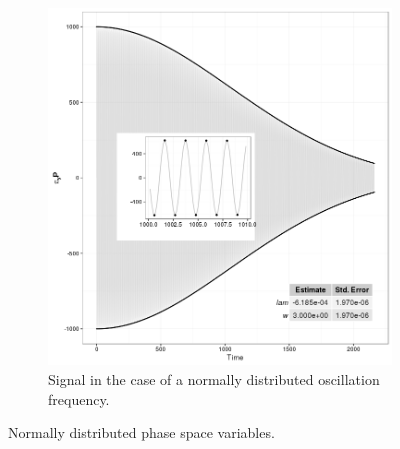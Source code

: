 \documentclass{article}
\begin{document}
\begin{figure}[h]
\begin{subfigure}{.5\textwidth}
		\includegraphics[scale=.5]{../img/Sgl_NormDistros}
		\caption{Signal in the case of a normally distributed oscillation frequency.}
	\end{subfigure}
	\caption{Normally distributed phase space variables.\label{fig:Sgl_cDyNorm}}
\end{figure}
\end{document}
